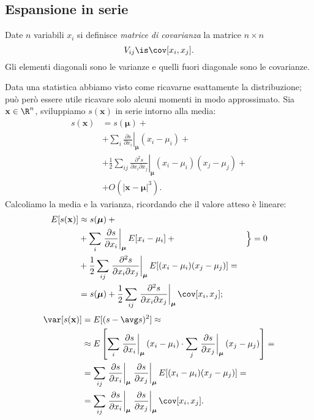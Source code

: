 
\subsection{Espansione in serie}

\begin{definition}
	Date $n$ variabili $x_i$ si definisce \emph{matrice di covarianza} la matrice $n\times n$
	\begin{equation*}
		V_{ij} \is \cov[x_i,x_j].
	\end{equation*}
	Gli elementi diagonali sono le varianze e quelli fuori diagonale sono le covarianze.
\end{definition}

Data una statistica abbiamo visto come ricavarne esattamente la distribuzione;
può però essere utile ricavare solo alcuni momenti in modo approssimato.
Sia $\mathbf x\in\R^n$, sviluppiamo $s(\mathbf x)$ in serie intorno alla media:
\begin{align*}
	s(\mathbf x) &= s(\boldsymbol \mu) + {}\\
	&+ \sum_i \left.\frac{\partial s}{\partial x_i}\right|_{\boldsymbol\mu} (x_i - \mu_i) + {}\\
	&+ \frac12 \sum_{ij} \left.\frac{\partial^2 s}{\partial x_i \partial x_j}\right|_{\boldsymbol\mu} (x_i-\mu_i)(x_j-\mu_j) + {}\\
	&+ O(|\mathbf x - \boldsymbol\mu|^3).
\end{align*}
Calcoliamo la media e la varianza, ricordando che il valore atteso è lineare:
\begin{align*}
	E[s(\mathbf x)] &\approx s(\boldsymbol \mu) + {}\\
	&+ \sum_i \left.\frac{\partial s}{\partial x_i}\right|_{\boldsymbol\mu} E[x_i - \mu_i] + {} & \Big\} = 0\\
	&+ \frac12 \sum_{ij} \left.\frac{\partial^2 s}{\partial x_i \partial x_j}\right|_{\boldsymbol\mu} E[(x_i-\mu_i)(x_j-\mu_j)] = \\
	&= s(\boldsymbol \mu) +
	\frac12 \sum_{ij} \left.\frac{\partial^2 s}{\partial x_i \partial x_j}\right|_{\boldsymbol\mu}
	\cov[x_i,x_j];
\end{align*}
\begin{align*}
	\var[s(\mathbf x)] &= E[(s - \avg s)^2] \approx \\
	&\approx E\left[
	\sum_i \left.\frac{\partial s}{\partial x_i}\right|_{\boldsymbol\mu} (x_i - \mu_i) \cdot
	\sum_j \left.\frac{\partial s}{\partial x_j}\right|_{\boldsymbol\mu} (x_j - \mu_j) \right] = \\
	&= \sum_{ij}
	\left.\frac{\partial s}{\partial x_i}\right|_{\boldsymbol\mu}
	\left.\frac{\partial s}{\partial x_j}\right|_{\boldsymbol\mu}
	E[ (x_i - \mu_i) (x_j - \mu_j) ] = \\
	&= \sum_{ij}
	\left.\frac{\partial s}{\partial x_i}\right|_{\boldsymbol\mu}
	\left.\frac{\partial s}{\partial x_j}\right|_{\boldsymbol\mu}
	\cov[x_i,x_j].
\end{align*}
